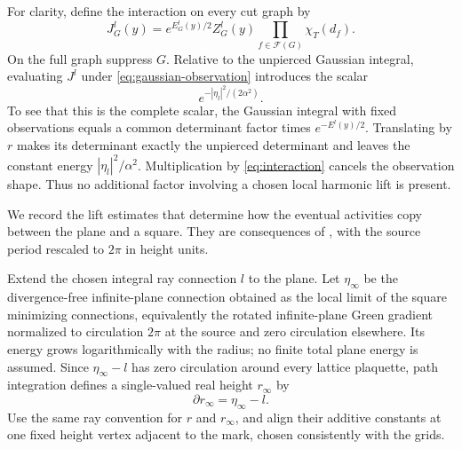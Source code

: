 For clarity, define the interaction on every cut graph by
\begin{equation}\label{eq:interaction}
 J_G^l(y)=e^{E_G^l(y)/2}Z_G^l(y)
                       \prod_{f\in\mathcal F(G)}\chi_T(d_f).
\end{equation}
On the full graph suppress $G$.  Relative to the unpierced Gaussian
integral, evaluating $J^l$ under \eqref{eq:gaussian-observation} introduces
the scalar
\begin{equation}\label{prep:magnetic-scalar}
                         e^{-|\eta_l|^2/(2\alpha^2)}.
\end{equation}
To see that this is the complete scalar, the Gaussian integral with
fixed observations equals a common determinant factor times
$e^{-E^l(y)/2}$.  Translating by $r$ makes its determinant exactly the
unpierced determinant and leaves the constant energy
$|\eta_l|^2/\alpha^2$.  Multiplication by \eqref{eq:interaction} cancels
the observation shape.  Thus no additional factor involving a chosen
local harmonic lift is present.

We record the lift estimates that determine how the eventual activities
copy between the plane and a square.  They are consequences of
\cite[Lemmas 4.2 and 5.2, and
the duality in Lemma 5.1]{B}, with the source period rescaled
to $2\pi$ in height units.

Extend the chosen integral ray connection $l$ to the plane.  Let
$\eta_\infty$ be the divergence-free infinite-plane connection obtained
as the local limit of the square minimizing connections, equivalently
the rotated infinite-plane Green gradient normalized to circulation
$2\pi$ at the source and zero circulation elsewhere.  Its energy grows
logarithmically with the radius; no finite total plane energy is assumed.
Since $\eta_\infty-l$ has zero circulation around every lattice plaquette,
path integration defines a single-valued real height $r_\infty$ by
\[
                         \partial r_\infty=\eta_\infty-l.
\]
Use the same ray convention for $r$ and $r_\infty$, and align their
additive constants at one fixed height vertex adjacent to the mark,
chosen consistently with the grids.

